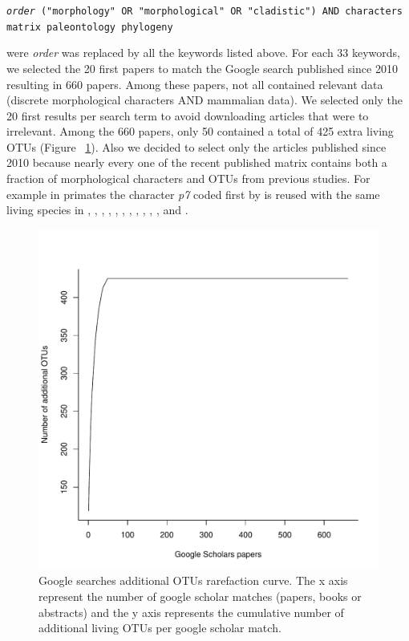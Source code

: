 \texttt{\textit{order} ("morphology" OR "morphological" OR "cladistic") AND characters matrix paleontology phylogeny}

were \textit{order} was replaced by all the keywords listed above. For each 33 keywords, we selected the 20 first papers to match the Google search published since 2010 resulting in 660 papers.
Among these papers, not all contained relevant data (discrete morphological characters AND mammalian data).
We selected only the 20 first results per search term to avoid downloading articles that were to irrelevant. Among the 660 papers, only 50 contained a total of 425 extra living OTUs (Figure ~\ref{Supp_figure_google_searches}).
Also we decided to select only the articles published since 2010 because nearly every one of the recent published matrix contains both a fraction of morphological characters and OTUs from previous studies.
For example in primates the character \textit{p7} coded first by \cite{ross1998phylogenetic} is reused with the same living species in \cite{seiffert2003fossil}, \cite{marivaux2005anthropoid}, \cite{seiffert2005basal}, \cite{bloch2007new}, \cite{bloch2007new}, \cite{kay2008anatomy}, \cite{silcox2008biogeographic}, \cite{seiffert2009convergent}, \cite{tabuce2009anthropoid}, \cite{boyer2010astragalar}, \cite{seiffert2010fossil}, \cite{marivaux2013djebelemur} and \cite{ni2013oldest}.

\begin{figure}[!htbp]
\centering
    \includegraphics[width=1\textwidth]{Missing_mammals/Figures/Supp_figure_google_searches.pdf}
\caption{Google searches additional OTUs rarefaction curve. The x axis represent the number of google scholar matches (papers, books or abstracts) and the y axis represents the cumulative number of additional living OTUs per google scholar match.}
\label{Supp_figure_google_searches}
\end{figure}

